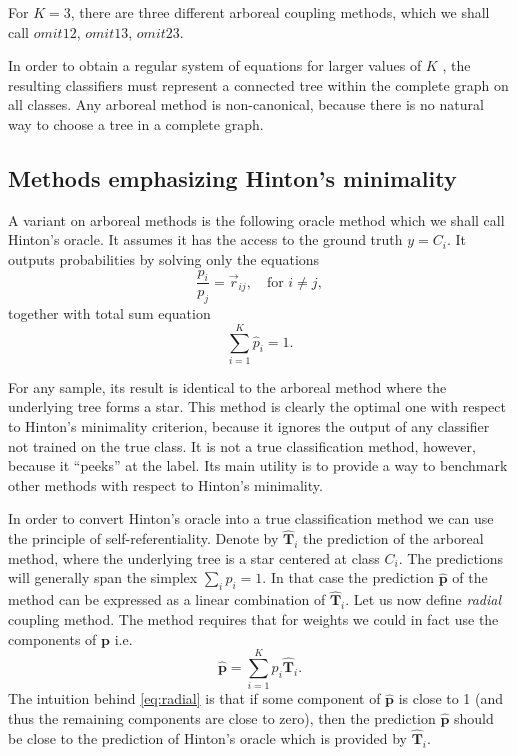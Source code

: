 \documentclass[twoside,11pt]{article}
\begin{document}
For $K=3$, there are three different arboreal coupling methods, which we shall call $omit12$, $omit13$, $omit23$. 

In order to obtain a regular system of equations for  larger values of $K$ , the resulting classifiers must represent a connected tree within the complete graph on all classes. Any arboreal method is non-canonical, because there is no natural way to choose a tree in a complete graph.

\subsection{Methods emphasizing Hinton's minimality}

A variant on arboreal methods is the following oracle method which we shall call Hinton's oracle. It  assumes it has the access to the ground truth $y = C_i$. It outputs probabilities by solving only the equations
$$
\frac{p_i}{p_j} = \vec{r}_{ij},\quad \textrm{for }i\not = j,
$$
together  with total sum equation
$$
\sum_{i=1}^K  \hat p_i = 1.
$$

For any sample, its result is identical to the arboreal method where the underlying tree forms a star. This method is clearly the optimal one with respect to Hinton's minimality criterion, because it ignores the output of any classifier not trained on the true class. It is not a true classification method, however, because it ``peeks'' at the label. Its main utility is to provide a way to benchmark other methods with respect to Hinton's minimality.

In order to convert Hinton's oracle into a true classification method we can use the principle of self-referentiality.  Denote by $\hat{\boldsymbol{T}}_i$ the prediction of the arboreal method, where the underlying tree is a star centered at class $C_i$. The predictions will generally span the simplex $\sum_i \hat p_i = 1$. In that case the prediction $\hat{\boldsymbol{p}}$ of the method  can be expressed as a linear combination of $\hat{\boldsymbol{T}}_i$. Let us now define \emph{radial} coupling method. The  method requires that for  weights we could in fact use the components of $\boldsymbol{p}$ i.e.
\begin{equation}
	\hat {\boldsymbol{p}} = \sum_{i=1}^K p_i \hat{\boldsymbol{T}}_i. \label{eq:radial}
\end{equation}
%
The intuition behind \eqref{eq:radial} is that if some component of $\hat{\boldsymbol{p}}$ is close to 1 (and thus the remaining components are close to zero), then the prediction $\hat{\boldsymbol{p}}$ should be close to the prediction of Hinton's oracle which is provided by $\hat{\boldsymbol{T}}_i$.
\end{document}
